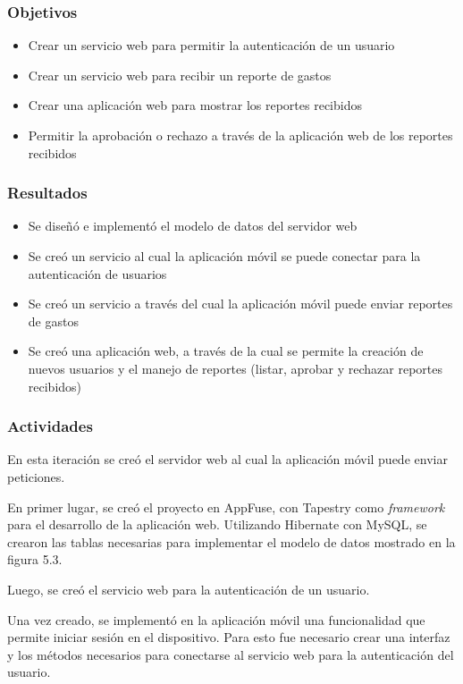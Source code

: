 \subsubsection{Objetivos}
\begin{itemize}
\item Crear un servicio web para permitir la autenticación de un usuario
\item Crear un servicio web para recibir un reporte de gastos
\item Crear una aplicación web para mostrar los reportes recibidos
\item Permitir la aprobación o rechazo a través de la aplicación web de los reportes recibidos
\end{itemize}
\subsubsection{Resultados}
\begin{itemize}
\item Se diseñó e implementó el modelo de datos del servidor web
\item Se creó un servicio al cual la aplicación móvil se puede conectar para la autenticación de usuarios
\item Se creó un servicio a través del cual la aplicación móvil puede enviar reportes de gastos
\item Se creó una aplicación web, a través de la cual se permite la creación de nuevos usuarios y el manejo de reportes (listar, aprobar y rechazar reportes recibidos)
\end{itemize}

\subsubsection{Actividades}

En esta iteración se creó el servidor web al cual la aplicación móvil puede enviar peticiones.

En primer lugar, se creó el proyecto en AppFuse, con Tapestry como \textit{framework} para el desarrollo de la aplicación web. Utilizando Hibernate con MySQL, se crearon las tablas necesarias para implementar el modelo de datos mostrado en la figura 5.3.

Luego, se creó el servicio web para la autenticación de un usuario. 

Una vez creado, se implementó en la aplicación móvil una funcionalidad que permite iniciar sesión en el dispositivo. Para esto fue necesario crear una interfaz y los métodos necesarios para conectarse al servicio web para la autenticación del usuario.

